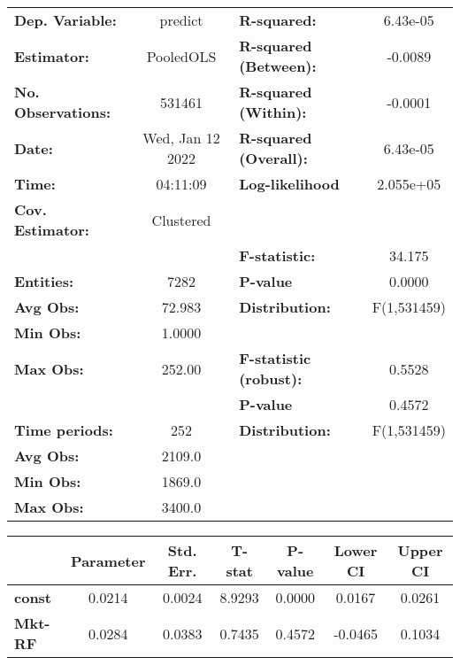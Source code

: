 \begin{center}
\begin{tabular}{lclc}
\toprule
\textbf{Dep. Variable:}    &      predict       & \textbf{  R-squared:         }   &     6.43e-05     \\
\textbf{Estimator:}        &     PooledOLS      & \textbf{  R-squared (Between):}  &     -0.0089      \\
\textbf{No. Observations:} &       531461       & \textbf{  R-squared (Within):}   &     -0.0001      \\
\textbf{Date:}             &  Wed, Jan 12 2022  & \textbf{  R-squared (Overall):}  &     6.43e-05     \\
\textbf{Time:}             &      04:11:09      & \textbf{  Log-likelihood     }   &    2.055e+05     \\
\textbf{Cov. Estimator:}   &     Clustered      & \textbf{                     }   &                  \\
\textbf{}                  &                    & \textbf{  F-statistic:       }   &      34.175      \\
\textbf{Entities:}         &        7282        & \textbf{  P-value            }   &      0.0000      \\
\textbf{Avg Obs:}          &       72.983       & \textbf{  Distribution:      }   &   F(1,531459)    \\
\textbf{Min Obs:}          &       1.0000       & \textbf{                     }   &                  \\
\textbf{Max Obs:}          &       252.00       & \textbf{  F-statistic (robust):} &      0.5528      \\
\textbf{}                  &                    & \textbf{  P-value            }   &      0.4572      \\
\textbf{Time periods:}     &        252         & \textbf{  Distribution:      }   &   F(1,531459)    \\
\textbf{Avg Obs:}          &       2109.0       & \textbf{                     }   &                  \\
\textbf{Min Obs:}          &       1869.0       & \textbf{                     }   &                  \\
\textbf{Max Obs:}          &       3400.0       & \textbf{                     }   &                  \\
\bottomrule
\end{tabular}
\begin{tabular}{lcccccc}
                & \textbf{Parameter} & \textbf{Std. Err.} & \textbf{T-stat} & \textbf{P-value} & \textbf{Lower CI} & \textbf{Upper CI}  \\
\midrule
\textbf{const}  &       0.0214       &       0.0024       &      8.9293     &      0.0000      &       0.0167      &       0.0261       \\
\textbf{Mkt-RF} &       0.0284       &       0.0383       &      0.7435     &      0.4572      &      -0.0465      &       0.1034       \\
\bottomrule
\end{tabular}
\end{center}
